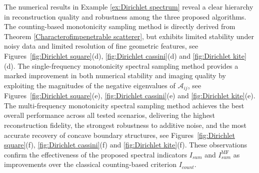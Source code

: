 \documentclass[11pt,reqno,twoside]{amsart}
\theoremstyle{definition}
\theoremstyle{remark}
\numberwithin{equation}{section}
\begin{document}
The numerical results in Example \ref{ex:Dirichlet spectrum} reveal a clear hierarchy in reconstruction quality and robustness among the three proposed algorithms. The counting-based monotonicity sampling method is directly derived from Theorem \ref{Characterofimpenetrable scatterer}, but exhibits limited stability under noisy data and limited resolution of fine geometric features, see Figures~\ref{fig:Dirichlet square}(d), \ref{fig:Dirichlet cassini}(d) and \ref{fig:Dirichlet kite}(d). The single-frequency monotonicity spectral sampling method provides a marked improvement in both numerical stability and imaging quality by exploiting the magnitudes of the negative eigenvalues of $\mathcal{A}_{ij}$, see Figures~\ref{fig:Dirichlet square}(e), \ref{fig:Dirichlet cassini}(e) and \ref{fig:Dirichlet kite}(e). The multi-frequency monotonicity spectral sampling method achieves the best overall performance across all tested scenarios, delivering the highest reconstruction fidelity, the strongest robustness to additive noise, and the most accurate
recovery of concave boundary structures, see Figures~\ref{fig:Dirichlet square}(f), \ref{fig:Dirichlet cassini}(f) and \ref{fig:Dirichlet kite}(f). These observations confirm the effectiveness of the proposed spectral indicators $I_{sum}$ and $I_{sum}^{\mathrm{MF}}$ as improvements over the classical counting-based criterion $I_{count}$.
\end{document}
